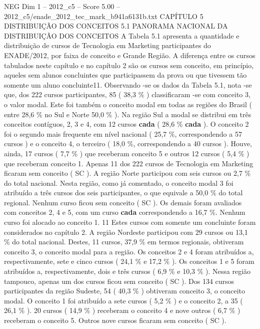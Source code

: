 \begin{textsample}{NEG Dim 1 – 2012\_c5 – Score 5.00 – 2012\_c5/enade\_2012\_tec\_mark\_b941a6131b.txt}  \label{ex:f1_neg_324}
CAPÍTULO 5 DISTRIBUIÇÃO DOS CONCEITOS 5.1 PANORAMA NACIONAL DA DISTRIBUIÇÃO DOS CONCEITOS A Tabela 5.1 apresenta a quantidade e distribuição de cursos de Tecnologia em Marketing participantes do ENADE/2012, por faixa de conceito e Grande Região.
A diferença entre os cursos tabulados neste capítulo e no capítulo 2 são os cursos sem conceito, em princípio, aqueles sem alunos concluintes que participassem da prova ou que tivessem tão somente um aluno concluinte11.
Observando -se os dados da Tabela 5.1, nota -se que, dos 222 cursos participantes, 85 ( 38,3 \% ) classificaram -se com conceito 3, o valor modal.
Este foi também o conceito modal em todas as regiões do Brasil ( entre 28,6 \% no Sul e Norte 50,0 \% ).
Na região Sul a modal se distribui em três conceitos contíguos, 2, 3 e 4, com 12 cursos \textbf{cada} ( 28,6 \% \textbf{cada} ).
O conceito 2 foi o segundo mais frequente em nível nacional ( 25,7 \%, correspondendo a 57 cursos ) e o conceito 4, o terceiro ( 18,0 \%, correspondendo a 40 cursos ).
Houve, ainda, 17 cursos ( 7,7 \% ) que receberam conceito 5 e outros 12 cursos ( 5,4 \% ) que receberam conceito 1.
Apenas 11 dos 222 cursos de Tecnologia em Marketing ficaram sem conceito ( SC ).
A região Norte participou com seis cursos ou 2,7 \% do total nacional.
Nesta região, como já comentado, o conceito modal 3 foi atribuído a três cursos dos seis participantes, o que equivale a 50,0 \% do total regional.
Nenhum curso ficou sem conceito ( SC ).
Os demais foram avaliados com conceitos 2, 4 e 5, com um curso \textbf{cada} correspondendo a 16,7 \%.
Nenhum curso foi alocado ao conceito 1. 11 Estes cursos com somente um concluinte foram considerados no capítulo 2.
A região Nordeste participou com 29 cursos ou 13,1 \% do total nacional.
Destes, 11 cursos, 37,9 \% em termos regionais, obtiveram conceito 3, o conceito modal para a região.
Os conceitos 2 e 4 foram atribuídos a, respectivamente, sete e cinco cursos ( 24,1 \% e 17,2 \% ).
Os conceitos 1 e 5 foram atribuídos a, respectivamente, dois e três cursos ( 6,9 \% e 10,3 \% ).
Nessa região tampouco, apenas um dos cursos ficou sem conceito ( SC ).
Dos 134 cursos participantes da região Sudeste, 54 ( 40,3 \% ) obtiveram conceito 3, o conceito modal.
O conceito 1 foi atribuído a sete cursos ( 5,2 \% ) e o conceito 2, a 35 ( 26,1 \% ). 20 cursos ( 14,9 \% ) receberam o conceito 4 e nove outros ( 6,7 \% ) receberam o conceito 5.
Outros nove cursos ficaram sem conceito ( SC ).

\end{textsample}
